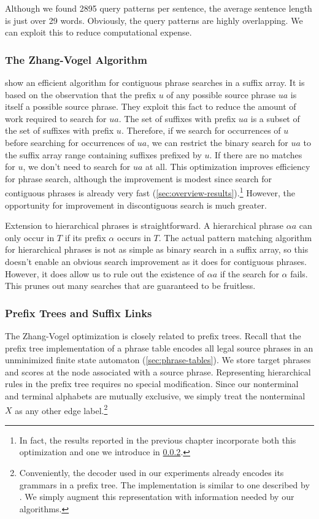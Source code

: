 Although we found 2895 query patterns per sentence,
the average sentence length is just over 29 words.
Obviously, the query patterns are highly overlapping.
We can exploit this to reduce computational expense.

\subsubsection{The Zhang-Vogel Algorithm}\label{sec:zhang-vogel}

\citet{Zhang:2005:eamt} show an efficient algorithm
for contiguous phrase searches in a suffix array.  It is based
on the observation that the prefix $u$ of any possible
source phrase $ua$ is itself a possible source
phrase.  They exploit this fact to reduce the amount of work required
to search for $ua$.  The set of suffixes with prefix $ua$ is
a subset of the set of suffixes with prefix $u$.
Therefore, if we search for occurrences of
$u$ before searching for occurrences of $ua$, we can
restrict the binary search for $ua$ to the suffix array range
containing suffixes prefixed by $u$.
If there are no matches for $u$, we
don't need to search for $ua$ at all.  
This optimization improves efficiency for
phrase search, although the improvement is
modest since search for contiguous phrases
is already very fast
(\textsection\ref{sec:overview-results}).\footnote{
In fact, the results reported 
in the previous chapter incorporate both
this optimization and one we introduce in 
\textsection\ref{sec:zv-improvements}.}
However, the opportunity for improvement in discontiguous search
is much greater.  

Extension to hierarchical
phrases is straightforward.  A hierarchical
phrase $\alpha{}a$ can only occur in $T$ if its
prefix $\alpha$ occurs in $T$.  The actual pattern matching
algorithm for hierarchical phrases is not as simple
as binary search in a suffix array, so this doesn't
enable an obvious search improvement as it does for
contiguous phrases.  However, it does allow us to rule out the 
existence of $\alpha{}a$ if the search for $\alpha$
fails.  This prunes out many searches
that are guaranteed to be fruitless.

\subsubsection{Prefix Trees and Suffix Links}\label{sec:zv-improvements}

The Zhang-Vogel optimization is closely related to
prefix trees.  Recall that the prefix tree implementation of a phrase
table encodes all legal source phrases in an unminimized 
finite state automaton (\textsection\ref{sec:phrase-tables}).  
We store target phrases and scores
at the node associated with a source phrase.
Representing hierarchical rules in the prefix tree
requires no special modification.  Since our nonterminal
and terminal alphabets are mutually exclusive, we simply
treat the nonterminal $X$ as any other edge 
label.\footnote{Conveniently, the decoder used in our
experiments \citep{Chiang:2007:cl} already encodes its
grammars in a prefix tree.  The implementation is 
similar to one described by \citet{Klein:2001:acl}.  We
simply augment this representation with information
needed by our algorithms.}

